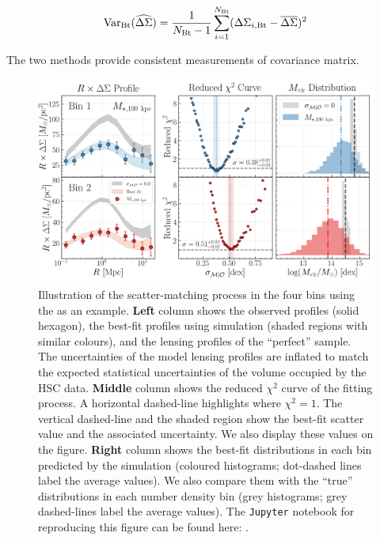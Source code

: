 \documentclass[fleqn,usenatbib,useAMS]{mnras}
\begin{document}
\begin{CJK*}{UTF8}{gbsn}
    \begin{equation}
        \mathrm{Var}_{\rm Bt}(\widehat{\Delta\Sigma}) = \frac{1}{N_{\rm Bt} - 1} \sum\limits_{i=1}^{N_{\rm Bt}} (\Delta\Sigma_{i, \rm Bt} - \overline{\Delta\Sigma})^2
    \end{equation}

    \noindent The two methods provide consistent measurements of covariance matrix.


  \begin{figure}
      \centering
      \includegraphics[width=\textwidth]{figure/fig_A1}
      \caption{
          Illustration of the scatter-matching process in the four \topn{} bins using the
           as an example.
          \textbf{Left} column shows the observed \rdsigma{} profiles (solid hexagon), the best-fit
          profiles using  simulation (shaded regions with similar colours), and the
          lensing profiles of the ``perfect'' \topn{} sample.
          The uncertainties of the model lensing profiles are inflated to match the expected
          statistical uncertainties of the volume occupied by the HSC data.
          \textbf{Middle} column shows the reduced $\chi^{2}$ curve of the fitting process.
          A horizontal dashed-line highlights where $\chi^{2}=1$.
          The vertical dashed-line and the shaded region show the best-fit scatter value and the
          associated uncertainty. We also display these values on the figure.
          \textbf{Right} column shows the best-fit \mvir{} distributions in each bin predicted
          by the  simulation (coloured histograms; dot-dashed lines label the average
          \mvir{} values).
          We also compare them with the ``true'' \mvir{} distributions in each number density bin
          (grey histograms; grey dashed-lines label the average \mvir{} values).
          The \texttt{Jupyter} notebook for reproducing this figure can be found here:
          \href{https://github.com/dr-guangtou/jianbing/blob/master/notebooks/figure/figA1.ipynb}{\faGithub}.
      }
      \label{fig:fitting}
  \end{figure}


\end{CJK*}
\end{document}
